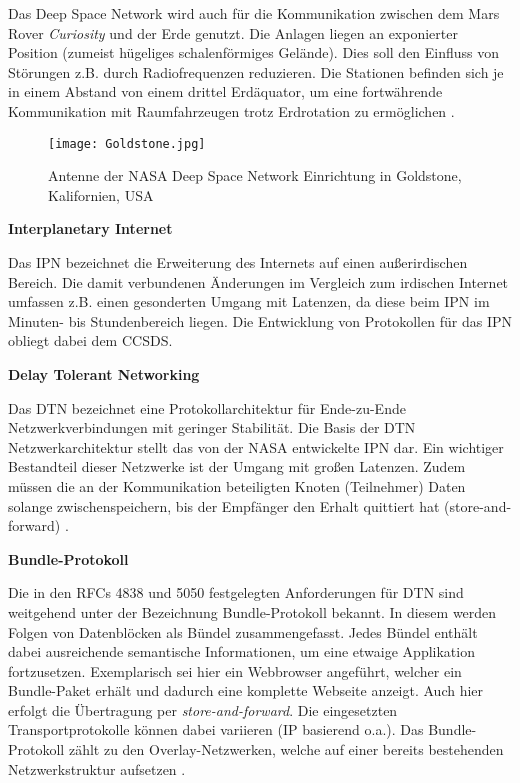 Das Deep Space Network wird auch f{\"u}r die Kommunikation zwischen dem Mars
Rover \textit{Curiosity} und der Erde genutzt. Die Anlagen liegen an exponierter Position
(zumeist h{\"u}geliges schalenf{\"o}rmiges Gel{\"a}nde). Dies soll den
Einfluss von St{\"o}rungen z.B. durch Radiofrequenzen reduzieren. Die Stationen
befinden sich je in einem Abstand von einem drittel Erd{\"a}quator, um eine
fortw{\"a}hrende Kommunikation mit Raumfahrzeugen trotz Erdrotation zu
erm{\"o}glichen \cite{web6}.

\begin{figure}[H]
\centering
\texttt{[image: Goldstone.jpg]}
\caption[Antenne der NASA Deep Space Network Einrichtung in Goldstone, Kalifornien, USA]
{Antenne der NASA Deep Space Network Einrichtung in Goldstone, Kalifornien, USA \cite{imgGoldstone}}
\label{fig:Goldstone}
\end{figure}

\textbf{Interplanetary Internet}

Das \gls{IPN} bezeichnet die Erweiterung des Internets
auf einen au{\ss}erirdischen Bereich. Die damit verbundenen {\"A}nderungen im
Vergleich zum irdischen Internet umfassen z.B. einen gesonderten Umgang mit
Latenzen, da diese beim \gls{IPN} im Minuten- bis Stundenbereich liegen. Die
Entwicklung von Protokollen f{\"u}r das \gls{IPN} obliegt dabei dem \gls{CCSDS}.

\textbf{Delay Tolerant Networking}

Das \gls{DTN} bezeichnet eine Protokollarchitektur f{\"u}r
Ende-zu-Ende Netzwerkverbindungen mit geringer Stabilit{\"a}t. Die Basis der
\gls{DTN} Netzwerkarchitektur stellt das von der NASA entwickelte \gls{IPN} dar. Ein wichtiger
Bestandteil dieser Netzwerke ist der Umgang mit gro{\ss}en Latenzen. Zudem
m{\"u}ssen die an der Kommunikation beteiligten Knoten (Teilnehmer)
Daten solange zwischenspeichern, bis der Empf{\"a}nger den Erhalt quittiert hat
(store-and-forward) \cite{web3}.

\textbf{Bundle-Protokoll}

Die in den RFCs 4838 und 5050 festgelegten Anforderungen f{\"u}r \gls{DTN} sind
weitgehend unter der Bezeichnung Bundle-Protokoll bekannt. In diesem werden
Folgen von Datenbl{\"o}cken als B{\"u}ndel zusammengefasst. Jedes B{\"u}ndel enth{\"a}lt
dabei ausreichende semantische Informationen, um eine etwaige Applikation
fortzusetzen. Exemplarisch sei hier ein Webbrowser angef{\"u}hrt, welcher ein
Bundle-Paket erh{\"a}lt und dadurch eine komplette Webseite anzeigt. Auch hier
erfolgt die {\"U}bertragung per \textit{store-and-forward}. Die eingesetzten
Transportprotokolle k{\"o}nnen dabei variieren (\gls{IP} basierend o.a.). Das
Bundle-Protokoll z{\"a}hlt zu den Overlay-Netzwerken, welche
auf einer bereits bestehenden Netzwerkstruktur aufsetzen \cite{web1}.

